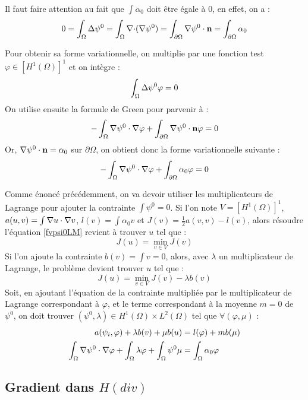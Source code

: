 Il faut faire attention au fait que $\int \alpha_0$ doit être égale à 0, en effet, on a :
\[ 0=\int_\Omega {\Delta} \psi^0 = \int_\Omega {\nabla\cdot}({\nabla}\psi^0) = \int_{\partial\Omega} {\nabla}\psi^0\cdot \mathbf{n} = \int_{\partial\Omega} \alpha_0 \]

Pour obtenir sa forme variationnelle, on multiplie par une fonction test $\varphi\in [H^1(\Omega)]^1$ et on intègre :
\[ \int_\Omega {\Delta}\psi^0 \varphi = 0 \]
On utilise ensuite la formule de Green pour parvenir à :
\[ -\int_\Omega {\nabla}\psi^0\cdot{\nabla}\varphi + \int_{\partial\Omega} {\nabla}\psi^0\cdot \mathbf{n}\varphi = 0 \]
Or, ${\nabla}\psi^0\cdot \mathbf{n} = \alpha_0$ sur $\partial\Omega$, on obtient donc la forme variationnelle suivante :
\begin{equation}\label{fvpsi0LM} -\int_\Omega {\nabla}\psi^0\cdot{\nabla}\varphi + \int_{\partial\Omega} \alpha_0\varphi = 0
\end{equation}

Comme énoncé précédemment, on va devoir utiliser les multiplicateurs de Lagrange pour ajouter la contrainte $\int \psi^0=0$.
Si l'on note $V=[H^1(\Omega)]^1$, $a(u,v)=\int {\nabla} u \cdot {\nabla} v$, $l(v)=\int \alpha_0v$ et $J(v)=\frac{1}{2}a(v,v)-l(v)$, alors résoudre l'équation \ref{fvpsi0LM} revient à trouver $u$ tel que :
\[ J(u) = \min_{v\in V} J(v) \]
Si l'on ajoute la contrainte $b(v) = \int v = 0$, alors, avec $\lambda$ un multiplicateur de Lagrange, le problème devient trouver $u$ tel que :
\[ J(u) = \min_{v\in V} J(v) - \lambda b(v) \]
Soit, en ajoutant l'équation de la contrainte multipliée par le multiplicateur de Lagrange correspondant à $\varphi$, et le terme correspondant à la moyenne $m=0$ de $\psi^0$, on doit trouver $(\psi^0,\lambda)\in H^1(\Omega)\times L^2(\Omega)$ tel que $\forall (\varphi,\mu)$ :
\begin{align}\label{fvpsi0}
a(\psi_i,\varphi) + \lambda b(v) + \mu b(u) &= l(\varphi) + m b(\mu) \notag \\
\int_\Omega {\nabla}\psi^0\cdot{\nabla}\varphi + \int_\Omega \lambda\varphi + \int_\Omega \psi^0\mu &= \int_\Omega \alpha_0\varphi
\end{align}

\subsection{Gradient dans $H(div)$}

